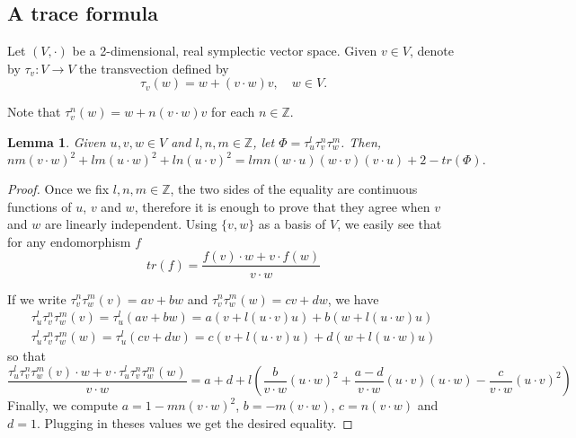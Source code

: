 \documentclass[11pt,a4paper]{amsart}
\newcommand{\Z}{\mathbb Z}
\newcommand{\tr}{tr}
\newtheorem{lemma}[thm]{Lemma}
\theoremstyle{definition}
\numberwithin{equation}{section}
\begin{document}
\subsection{A trace formula}\label{ss:trace} 

Let $(V,\cdot)$ be a 2-dimensional, real symplectic vector space. Given $v\in V$, denote 
by $\tau_v: V\to V$ the transvection defined by 
$$
\tau_v(w) = w + (v\cdot w) v,\quad w\in V.
$$

Note that $\tau^n_v(w) = w + n(v\cdot w) v$ for each $n\in\Z$. 

\begin{lemma}\label{l:traceformula}
Given $u,v,w\in V$ and $l,n, m\in\Z$, let $\Phi = \tau^l_u\tau^n_v\tau^m_w$. Then,    
\[
nm(v\cdot w)^2+lm(u\cdot w)^2+ln(u\cdot v)^2 = lmn(w\cdot u)(w\cdot v)(v\cdot u) + 2 - \tr(\Phi).
\]
\end{lemma}

\begin{proof}
Once we fix $l,n,m \in \mathbb{Z}$, the two sides of the equality are continuous functions 
of $u$, $v$ and $w$, therefore it is enough to prove that they agree when $v$ and $w$ 
are linearly independent. Using $\{v,w\}$ as a basis of $V$, we easily see that for 
any endomorphism $f$
\[
\tr(f)=\dfrac{f(v) \cdot w+v \cdot f(w)}{v \cdot w}
\]

If we write $\tau_v^n \tau_w^m(v)=av+bw$ and $\tau_v^n \tau_w^m(w)=cv+dw$, we have
\[
\begin{split}
\tau_u^l \tau_v^n \tau_w^m(v)=\tau_u^l (av+bw)=a(v+l(u \cdot v)u)+b(w+l(u \cdot w)u)\\
\tau_u^l \tau_v^n \tau_w^m(w)=\tau_u^l (cv+dw)=c(v+l(u \cdot v)u)+d(w+l(u \cdot w)u)
\end{split}
\]
so that
\[
\dfrac{\tau_u^l \tau_v^n \tau_w^m(v) \cdot w + v \cdot \tau_u^l \tau_v^n \tau_w^m(w)}{v \cdot w}=a+d+l\left(\dfrac{b}{v \cdot w}(u \cdot w)^2+\dfrac{a-d}{v \cdot w}(u \cdot v)(u \cdot w)-\dfrac{c}{v \cdot w}(u \cdot v)^2\right)
\]
Finally, we compute $a=1-mn(v \cdot w)^2$, $b=-m(v \cdot w)$, $c=n(v \cdot w)$ and $d=1$. 
Plugging in theses values we get the desired equality.
\end{proof}
\end{document}
